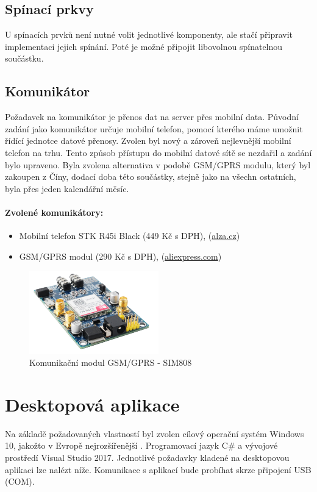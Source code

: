 \documentclass[FM,DP]{tulthesis}  %
\begin{document}
\subsection{Spínací prkvy}
U spínacích prvků není nutné volit jednotlivé komponenty, ale stačí připravit implementaci jejich spínání. Poté je možné připojit libovolnou spínatelnou součástku.

\subsection{Komunikátor}
Požadavek na komunikátor je přenos dat na server přes mobilní data. Původní zadání jako komunikátor určuje mobilní telefon, pomocí kterého máme umožnit řídící jednotce datové přenosy. Zvolen byl nový a zároveň nejlevnější mobilní telefon na trhu. Tento způsob přístupu do mobilní datové sítě se nezdařil a zadání bylo upraveno. Byla zvolena alternativa v podobě GSM/GPRS modulu, který byl zakoupen z Číny, dodací doba této součástky, stejně jako na všechn ostatních, byla přes jeden kalendářní měsíc.

\paragraph{Zvolené komunikátory:}
\begin{itemize}
\item Mobilní telefon STK R45i Black (449 Kč s DPH), (\url{alza.cz})
\item GSM/GPRS modul (290 Kč s DPH), (\url{aliexpress.com})
\end{itemize} 

\begin{figure}[H]
\begin{center}
\includegraphics[width=0.5\textwidth]{images/gprs.png}
\caption{Komunikační modul GSM/GPRS - SIM808}
\label{image}
\end{center}
\end{figure}

\section{Desktopová aplikace}
Na základě požadovaných vlastností byl zvolen cílový operační systém Windows 10, jakožto v Evropě nejrozšířenější \cite{DesktopMarketShare}. Programovací jazyk C\# a vývojové prostředí Visual Studio 2017. Jednotlivé požadavky kladené na desktopovou aplikaci lze nalézt níže. Komunikace s aplikací bude probíhat skrze připojení USB (COM).
\end{document}
